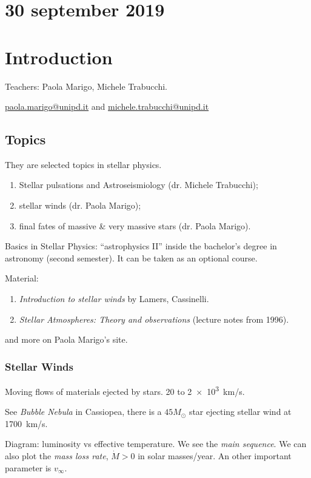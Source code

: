 \documentclass[main.tex]{subfiles}
\begin{document}
\section*{30 september 2019}
\section{Introduction}

Teachers: Paola Marigo, Michele Trabucchi.

\url{paola.marigo@unipd.it} and
\url{michele.trabucchi@unipd.it}

\subsection{Topics}

They are selected topics in stellar physics.
%
\begin{enumerate}
    \item Stellar pulsations and Astroseismiology (dr. Michele Trabucchi);
    \item stellar winds (dr. Paola Marigo);
    \item final fates of massive \& very massive stars (dr. Paola Marigo).
\end{enumerate}
%
Basics in Stellar Physics: ``astrophysics II'' inside the bachelor's degree in astronomy (second semester). It can be taken as an optional course.

Material:

\begin{enumerate}
    \item \emph{Introduction to stellar winds} by Lamers, Cassinelli.
    \item \emph{Stellar Atmospheres: Theory and observations} (lecture notes from 1996).
\end{enumerate}
%
and more on Paola Marigo's site.

\subsubsection{Stellar Winds}

Moving flows of materials ejected by stars. 20 to \SI{2e3}{km/s}.

See \emph{Bubble Nebula} in Cassiopea, there is a \(45 M_{\odot}\) star ejecting stellar wind at \SI{1700}{km/s}.

Diagram: luminosity vs effective temperature. We see the \emph{main sequence}.
We can also plot the \emph{mass loss rate}, \(\dot{M}>0 \) in solar masses/year.
An other important parameter is \(v_\infty\).
\end{document}
